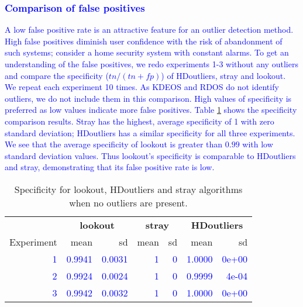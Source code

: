 \documentclass[
]{article}
\begin{document}
\hypertarget{section}{%
\subsubsection*{\texorpdfstring{\textcolor{blue}{Comparison of false positives }}{}}\label{section}}

\textcolor{blue}{
A low false positive rate is an attractive feature for an outlier detection method. High false positives diminish user confidence with the risk of abandonment of such systems; consider a home security system with constant alarms. To get an understanding of the false positives, we redo experiments 1-3 without any outliers and compare the specificity ($tn/(tn+fp)$) of HDoutliers, stray and lookout. We repeat each experiment 10 times. As KDEOS and RDOS do not identify outliers, we do not include them in this comparison. High values of specificity is preferred as low values indicate more false positives. Table \ref{tab:zerooutliers} shows the specificity comparison results. Stray has the highest, average specificity of 1 with zero standard deviation;  HDoutliers has a similar specificity for all three experiments. We see that the average specificity of lookout is greater than $0.99$ with low standard deviation values. Thus lookout's specificity is comparable to HDoutliers and stray, demonstrating that its false positive rate is low. }

\begin{table}

\caption{\label{tab:zerooutliers}Specificity for lookout, HDoutliers and stray algorithms when no outliers are present.}
\centering
\begin{tabular}[t]{rrrrrrr}
\toprule
\multicolumn{1}{c}{\textbf{}} & \multicolumn{2}{c}{\textbf{lookout}} & \multicolumn{2}{c}{\textbf{stray}} & \multicolumn{2}{c}{\textbf{HDoutliers}} \\
\cmidrule(l{3pt}r{3pt}){2-3} \cmidrule(l{3pt}r{3pt}){4-5} \cmidrule(l{3pt}r{3pt}){6-7}
Experiment & mean & sd & mean & sd & mean & sd\\
\midrule
\textcolor{blue}{1} & \textcolor{blue}{0.9941} & \textcolor{blue}{0.0031} & \textcolor{blue}{1} & \textcolor{blue}{0} & \textcolor{blue}{1.0000} & \textcolor{blue}{0e+00}\\
\textcolor{blue}{2} & \textcolor{blue}{0.9924} & \textcolor{blue}{0.0024} & \textcolor{blue}{1} & \textcolor{blue}{0} & \textcolor{blue}{0.9999} & \textcolor{blue}{4e-04}\\
\textcolor{blue}{3} & \textcolor{blue}{0.9942} & \textcolor{blue}{0.0032} & \textcolor{blue}{1} & \textcolor{blue}{0} & \textcolor{blue}{1.0000} & \textcolor{blue}{0e+00}\\
\bottomrule
\end{tabular}
\end{table}
\end{document}
